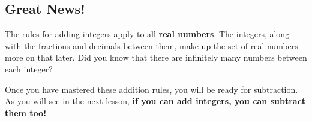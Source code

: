 \documentclass{ximera}[font=12pt]
\begin{document}
\subsection*{Great News!}

The rules for adding integers apply to all \textbf{real numbers}.  The integers, along with the fractions and 
decimals between them, make up the set of real numbers—more on that later.  Did you know that there are infinitely 
many numbers between each integer?

Once you have mastered these addition rules, you will be ready for subtraction.  As you will see in the next lesson,
\textbf{if you can add integers, you can subtract them too!}
\end{document}
